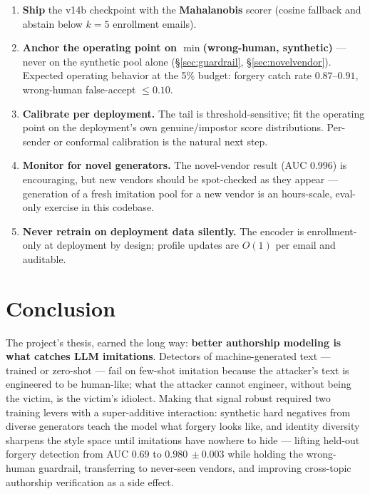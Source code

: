 \documentclass[11pt]{article}
\newcommand{\ms}[2]{\ensuremath{#1{\scriptstyle\,\pm #2}}}
\newcommand{\vbest}{v14b}
\begin{document}
\begin{enumerate}[leftmargin=2em]
\item \textbf{Ship} the \vbest{} checkpoint with the \textbf{Mahalanobis} scorer
      (cosine fallback and abstain below $k{=}5$ enrollment emails).
\item \textbf{Anchor the operating point on $\min$(wrong-human, synthetic)} --- never on the
      synthetic pool alone (\S\ref{sec:guardrail}, \S\ref{sec:novelvendor}). Expected operating
      behavior at the 5\% budget: forgery catch rate $0.87$--$0.91$, wrong-human false-accept
      ${\leq}0.10$.
\item \textbf{Calibrate per deployment.} The tail is threshold-sensitive; fit the operating point
      on the deployment's own genuine/impostor score distributions. Per-sender or conformal
      calibration is the natural next step.
\item \textbf{Monitor for novel generators.} The novel-vendor result (AUC 0.996) is encouraging,
      but new vendors should be spot-checked as they appear --- generation of a fresh imitation pool
      for a new vendor is an hours-scale, eval-only exercise in this codebase.
\item \textbf{Never retrain on deployment data silently.} The encoder is enrollment-only at
      deployment by design; profile updates are $O(1)$ per email and auditable.
\end{enumerate}

\section{Conclusion}
\label{sec:conclusion}

The project's thesis, earned the long way: \textbf{better authorship modeling is what catches LLM
imitations}. Detectors of machine-generated text --- trained or zero-shot --- fail on few-shot
imitation because the attacker's text is engineered to be human-like; what the attacker cannot
engineer, without being the victim, is the victim's idiolect. Making that signal robust required
two training levers with a super-additive interaction: synthetic hard negatives from diverse
generators teach the model what forgery looks like, and identity diversity sharpens the style
space until imitations have nowhere to hide --- lifting held-out forgery detection from AUC 0.69 to
\ms{0.980}{0.003} while holding the wrong-human guardrail, transferring to never-seen vendors, and
improving cross-topic authorship verification as a side effect.
\end{document}
